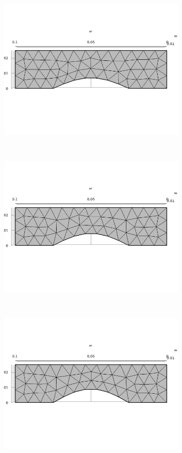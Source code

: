 \documentclass[a4paper]{article}
\begin{document}
\begin{figure}[h]
	\begin{subfigure}{0.22\linewidth}
		\centering
		\includegraphics[width=0.95\linewidth]{07.jpg}
	\end{subfigure}
	~
	\begin{subfigure}{0.22\linewidth}
		\centering
		\includegraphics[width=0.95\linewidth]{08.jpg}
	\end{subfigure}
	~
	\begin{subfigure}{0.22\linewidth}
		\centering
		\includegraphics[width=0.95\linewidth]{09.jpg}

\end{subfigure}
\end{figure}
\end{document}
